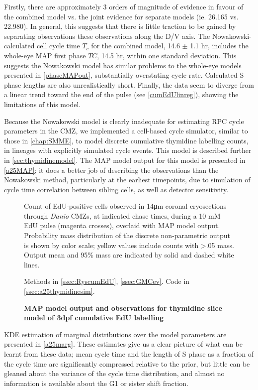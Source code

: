 Firstly, there are approximately 3 orders of magnitude of evidence in favour of the combined model vs. the joint evidence for separate models (ie. 26.165 vs. 22.980). In general, this suggests that there is little traction to be gained by separating observations these observations along the D/V axis. The Nowakowski-calculated cell cycle time $T_c$ for the combined model, 14.6 $\pm$ 1.1 hr, includes the whole-eye MAP first phase $TC$, 14.5 hr, within one standard deviation. This suggests the Nowakowski model has similar problems to the whole-eye models presented in \autoref{phaseMAPout}, substantially overstating cycle rate. Calculated S phase lengths are also unrealistically short. Finally, the data seem to diverge from a linear trend toward the end of the pulse (see \autoref{cumEdUlinreg}), showing the limitations of this model.

Because the Nowakowski model is clearly inadequate for estimating RPC cycle parameters in the CMZ, we implemented a cell-based cycle simulator, similar to those in \autoref{chap:SMME}, to model discrete cumulative thymidine labelling counts, in lineages with explicitly simulated cycle events. This model is described further in \autoref{sec:thymidinemodel}. The MAP model output for this model is presented in \autoref{a25MAP}; it does a better job of describing the observations than the Nowakowski method, particularly at the earliest timepoints, due to simulation of cycle time correlation between sibling cells, as well as detector sensitivity. 

\begin{figure}[!h]
    \caption{{\bf MAP model output and observations for thymidine slice model of 3dpf cumulative EdU labelling}}
    Count of EdU-positive cells observed in 14\si{\micro\metre} coronal cryosections through \textit{Danio} CMZs, at indicated chase times, during a 10 mM EdU pulse (magenta crosses), overlaid with MAP model output. Probability mass distribution of the discrete non-parametric output is shown by color scale; yellow values include counts with >.05 mass. Output mean and 95\% mass are indicated by solid and dashed white lines.

    Methods in \autoref{ssec:RyscumEdU}, \autoref{ssec:GMCev}. Code in \autoref{ssec:a25thymidinesim}.
    \label{a25MAP}
\end{figure}

KDE estimation of marginal distributions over the model parameters are presented in \autoref{a25marg}. These estimates give us a clear picture of what can be learnt from these data; mean cycle time and the length of S phase as a fraction of the cycle time are significantly compressed relative to the prior, but little can be gleaned about the variance of the cycle time distribution, and almost no information is available about the G1 or sister shift fraction.

